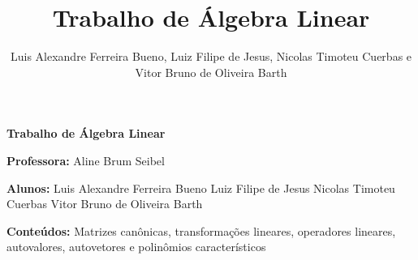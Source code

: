\documentclass[11pt,a4paper]{article}
\author{Luis Alexandre Ferreira Bueno, Luiz Filipe de Jesus, Nicolas Timoteu Cuerbas e Vitor Bruno de Oliveira Barth}
\title{Trabalho de Álgebra Linear }
\newcommand\tab[1][1.835cm]{\hspace*{#1}}
\begin{document}
\begin{center}
\textbf{Trabalho de Álgebra Linear}
\end{center}

\begin{flushleft}

\textbf{Professora: }Aline Brum Seibel\linebreak

\textbf{Alunos: } Luis Alexandre Ferreira Bueno\linebreak 
\tab Luiz Filipe de Jesus\linebreak
\tab Nicolas Timoteu Cuerbas\linebreak
\tab Vitor Bruno de Oliveira Barth\linebreak
	
\textbf{Conteúdos:} Matrizes canônicas, transformações lineares, operadores lineares, autovalores, autovetores e polinômios característicos \linebreak

%
%


\end{flushleft}
\end{document}
